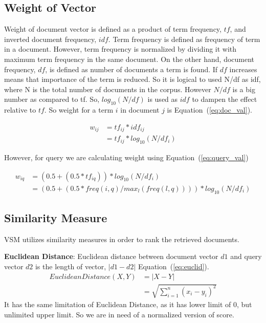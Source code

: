 \label{sec:design}

\subsection{Weight of Vector}
Weight of document vector is defined as a product of term frequency, $tf$, and inverted document frequency, $idf$. Term frequency is defined as frequency of term in a document. However, term
frequency is normalized by dividing it with maximum term frequency in the same document. On
the other hand, document frequency, $df$, is defined as number of documents a term is found. If $df$ increases means that importance of the term is reduced. So it is logical to used N/df as idf, where N is the total number of documents in the corpus. However $N/df$ is a big number as compared to tf. So, $log_{10} (N/df)$ is used as $idf$ to dampen the effect relative to $tf$. So weight for a term $i$ in document $j$ is Equation~(\ref{eq:doc_val}).

\begin{equation} \label{eq:doc_val}
\begin{split}
  w_{ij} & = tf_{ij} * idf_{ij} \\
         & = tf_{ij} * log_{10} (N/df_i)
\end{split}
\end{equation}

However, for query we are calculating weight using Equation~(\ref{eq:query_val})

\begin{equation} \label{eq:query_val}
\begin{split}
  w_{iq} & = (0.5 + (0.5 * tf_{iq})) * log_{10} (N/df_i) \\
         & = (0.5 + (0.5 * freq(i, q)/max_l(freq(l, q)))) * log_{10} (N/df_i)
\end{split}
\end{equation}

\subsection{Similarity Measure}
VSM utilizes similarity measures in order to rank the retrieved documents.

\textbf{Euclidean Distance}: Euclidean distance between document vector ${d1}$ and query vector ${d2}$ is the length of vector, ${|d1 - d2|}$ Equation~(\ref{eq:euclid}).
\begin{equation} \label{eq:euclid}
\begin{split}
  Euclidean Distance(X, Y) & = | X - Y| \\
                           & = \sqrt{\sum_{i = 1}^{n} {(x_i - y_i)^2}}
\end{split}
\end{equation}
It has the same limitation of Euclidean Distance, as it has lower limit of 0, but unlimited upper limit. So we are in need of a normalized version of score.


